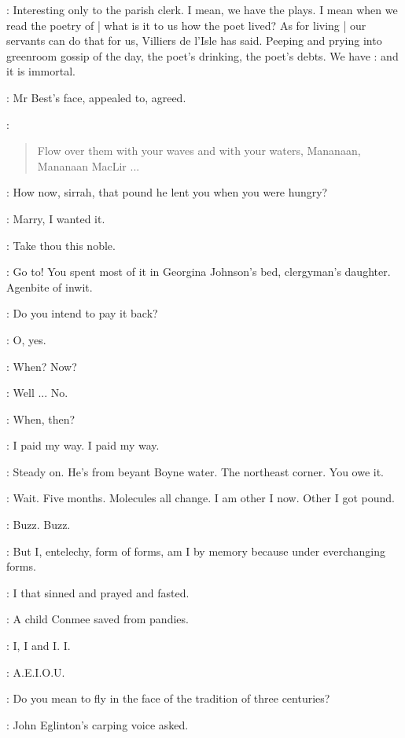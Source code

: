 \AErussell:
Interesting only to the parish clerk.
I mean,
we have the plays.
I mean when we read the poetry of  |
what is it to us how the poet lived?
As for living |
our servants can do that for us,
Villiers de l'Isle has said.
Peeping and prying into greenroom gossip of the day,
the poet's drinking,
the poet's debts.
We have :
and it is immortal.

:
Mr Best's face,
appealed to,
agreed.

\best:
\begin{verse}
    Flow over them with your waves and with your waters, Mananaan,
 \\
    Mananaan MacLir ...
\end{verse}

\StephenInt:
How now,
sirrah,
that pound he lent you when you were hungry?

\StephenInt:
Marry,
I wanted it.

\StephenInt:
Take thou this noble.

\StephenInt:
Go to!
You spent most of it in Georgina Johnson's bed,
clergyman's daughter.
Agenbite of inwit.

\StephenInt:
Do you intend to pay it back?

\StephenInt:
O, yes.

\StephenInt:
When?
Now?

\StephenInt:
Well ...
No.

\StephenInt:
When,
then?

\StephenInt:
I paid my way.
I paid my way.

\StephenInt:
Steady on.
He's from beyant Boyne water.
The northeast corner.
You owe it.

\StephenInt:
Wait.
Five months.
Molecules all change.
I am other I now.
Other I got pound.

\StephenInt:
Buzz.
Buzz.

\StephenInt:
But I,
entelechy,
form of forms,
am I by memory because under everchanging forms.

\StephenInt:
I that sinned and prayed and fasted.

\StephenInt:
A child Conmee saved from pandies.

\StephenInt:
I, I and I.
I.

\StephenInt:
A.E.I.O.U.

\eglinton:
Do you mean to fly in the face of the tradition of three centuries?

:
John Eglinton's carping voice asked.

